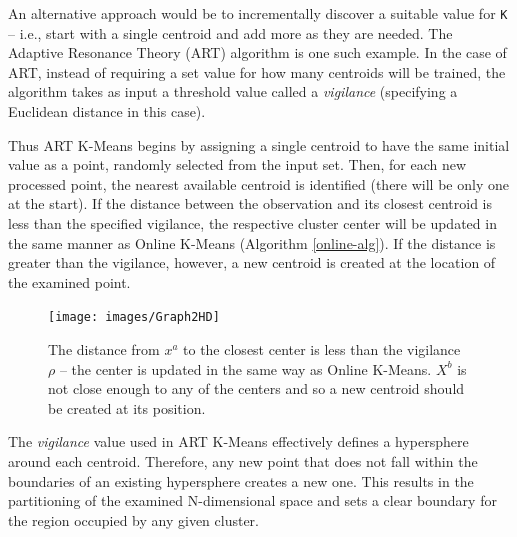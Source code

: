 \documentclass{l4proj}
\begin{document}
An alternative approach would be to incrementally discover a suitable value for \texttt{K} -- i.e., start with a single centroid and add more as they are needed. The Adaptive Resonance Theory (ART) algorithm\cite{ART} is one such example. In the case of ART, instead of requiring a set value for how many centroids will be trained, the algorithm takes as input a threshold value called a \textit{vigilance} (specifying a Euclidean distance in this case). 

Thus ART K-Means begins by assigning a single centroid to have the same initial value as a point, randomly selected from the input set. Then, for each new processed point, the nearest available centroid is identified (there will be only one at the start). If the distance between the observation and its closest centroid is less than the specified vigilance, the respective cluster center will be updated in the same manner as Online K-Means (Algorithm \ref{online-alg}). If the distance is greater than the vigilance, however, a new centroid is created at the location of the examined point.

\begin{figure}[H]
	\centering
    \label{artGraph}
    \texttt{[image: images/Graph2HD]}
    \caption{The distance from $x^a$ to the closest center is less than the vigilance $\rho$ -- the center is updated in the same way as Online K-Means. $X^b$ is not close enough to any of the centers and so a new centroid should be created at its position.} 
\end{figure}

The \textit{vigilance} value used in ART K-Means effectively defines a hypersphere around each centroid. Therefore, any new point that does not fall within the boundaries of an existing hypersphere creates a new one. This results in the partitioning of the examined N-dimensional space and sets a clear boundary for the region occupied by any given cluster. 
\end{document}
